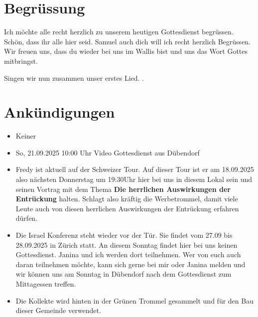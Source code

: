 \documentclass{../../inc/mybib}
\begin{document}
\section{Begrüssung}
Ich möchte alle recht herzlich zu unserem heutigen Gottesdienst begrüssen. Schön, dass ihr alle hier seid. Samuel auch dich will ich recht herzlich Begrüssen. Wir freuen uns, dass du wieder bei uns im Wallis bist und uns das Wort Gottes mitbringst. 

\beten{}

Singen wir nun zusammen unser erstes Lied.
{}.

\section{Ankündigungen}
\begin{itemize}
    \item {} Keiner
    \item {} So, 21.09.2025 10:00 Uhr Video Gottesdienst aus Dübendorf
    \item {} Fredy ist aktuell auf der Schweizer Tour. Auf dieser Tour ist er am 18.09.2025 also nächsten Donnerstag um 19:30Uhr hier bei uns in diesem Lokal sein und seinen Vortrag mit dem Thema \textbf{Die herrlichen Auswirkungen der Entrückung} halten. Schlagt also kräftig die Werbetrommel, damit viele Leute auch von diesen herrlichen Auswirkungen der Entrückung erfahren dürfen.
    \item {} Die Israel Konferenz steht wieder vor der Tür. Sie findet vom 27.09 bis 28.09.2025 in Zürich statt. An diesem Sonntag findet hier bei uns keinen Gottesdienst. Janina und ich werden dort teilnehmen. Wer von euch auch daran teilnehmen möchte, kann sich gerne bei mir oder Janina melden und wir können uns am Sonntag in Dübendorf nach dem Gottesdienst zum Mittagessen treffen.
    \item Die Kollekte wird hinten in der Grünen Trommel gesammelt und für den Bau dieser Gemeinde verwendet.
\end{itemize}
\end{document}
